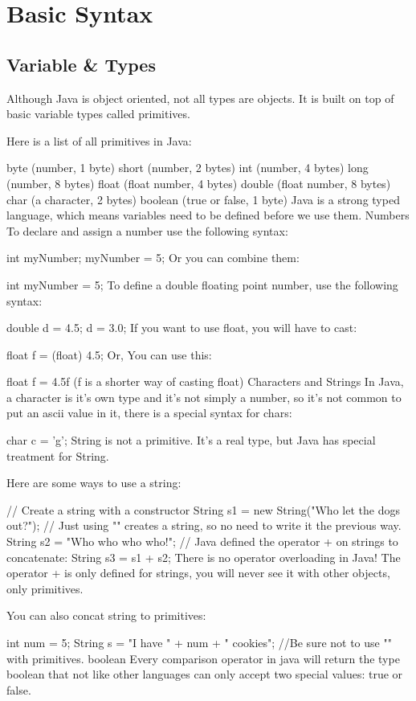\chapter{Basic Syntax}

\section{Variable & Types}

Although Java is object oriented, not all types are objects. It is built on top of basic variable types called primitives.

Here is a list of all primitives in Java:

byte (number, 1 byte)
short (number, 2 bytes)
int (number, 4 bytes)
long (number, 8 bytes)
float (float number, 4 bytes)
double (float number, 8 bytes)
char (a character, 2 bytes)
boolean (true or false, 1 byte) Java is a strong typed language, which means variables need to be defined before we use them.
Numbers
To declare and assign a number use the following syntax:

int myNumber;
myNumber = 5;
Or you can combine them:

int myNumber = 5;
To define a double floating point number, use the following syntax:

double d = 4.5;
d = 3.0;
If you want to use float, you will have to cast:

float f = (float) 4.5;
Or, You can use this:

float f = 4.5f (f is a shorter way of casting float)
Characters and Strings
In Java, a character is it's own type and it's not simply a number, so it's not common to put an ascii value in it, there is a special syntax for chars:

char c = 'g';
String is not a primitive. It's a real type, but Java has special treatment for String.

Here are some ways to use a string:

// Create a string with a constructor
String s1 = new String("Who let the dogs out?");
// Just using "" creates a string, so no need to write it the previous way.
String s2 = "Who who who who!";
// Java defined the operator + on strings to concatenate:
String s3 = s1 + s2;
There is no operator overloading in Java! The operator + is only defined for strings, you will never see it with other objects, only primitives.

You can also concat string to primitives:

int num = 5;
String s = "I have " + num + " cookies"; //Be sure not to use "" with primitives.
boolean
Every comparison operator in java will return the type boolean that not like other languages can only accept two special values: true or false.

